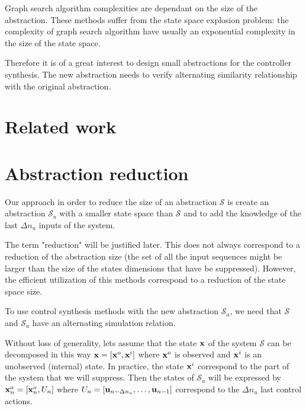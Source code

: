 \newcommand{\Ninputs}{\Delta n_u}%
\newcommand{\x}{\vect{x}}%
\newcommand{\xa}{\vect{x}^a}%
\newcommand{\xobs}{\vect{x}^o}%
\newcommand{\Xobs}{X^o}%
\newcommand{\Xobsinit}{X^o_0}%
\newcommand{\xunobs}{\vect{x}^i}%
\newcommand{\Xunobs}{X^i}%
\newcommand{\Xuinv}{{\mathcal{X}^i}}%
\newcommand{\pastuseq}{\vect{u}_{n-\Ninputs},\dots,\vect{u}_{n-1}}%
\newcommand{\Pastuseq}{U_n}%
\newcommand{\sys}{\mathcal{S}}%
\newcommand{\sysa}{\mathcal{S}_a}%
\newcommand{\sysaU}{\mathcal{U}}%
\newcommand{\sysA}{\mathcal{S}_A}%
\newcommand{\sysB}{\mathcal{S}_B}%
%
Graph search algorithm complexities are dependant on the size of the abstraction.
These methods suffer from the state space explosion problem: the complexity of graph search algorithm have usually an exponential complexity in the size of the state space.

Therefore it is of a great interest to design small abstractions for the controller synthesis.
The new abstraction needs to verify alternating similarity relationship with the original abstraction.

\section{Related work}

\section{Abstraction reduction}
Our approach in order to reduce the size of an abstraction $\sys$ is create an abstraction $\sysa$ with a smaller state space than $\sys$ and to add the knowledge of the last $\Ninputs$ inputs of the system.

The term "reduction" will be justified later. This does not always correspond to a reduction of the abstraction size (the set of all the input sequences might be larger than the size of the states dimensions that have be suppressed). However, the efficient utilization of this methods correspond to a reduction of the state space size.

To use control synthesis methods with the new abstraction $\sysa$, we need that $\sys$ and $\sysa$ have an alternating simulation relation.

Without loss of generality, lets assume that the state $\x$ of the system $\sys$ can be decomposed in this way $\x = [\xobs,\xunobs]$ where $\xobs$ is observed and $\xunobs$ is an unobserved (internal) state.
In practice, the state $\xunobs$ correspond to the part of the system that we will suppress.
Then the states of $\sysa$ will be expressed by $\xa_n = [\xobs_n,\Pastuseq]$ where $\Pastuseq = [\pastuseq]$ correspond to the $\Ninputs$ last control actions.

